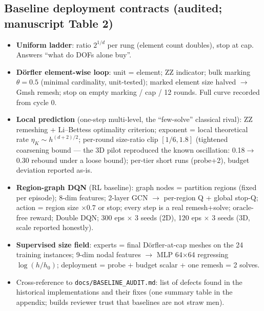 \documentclass[preprint,12pt]{elsarticle}
\newenvironment{plan}{\begin{itemize}\setlength\itemsep{0.15em}}{\end{itemize}}
\begin{document}
\subsection{Baseline deployment contracts (audited; manuscript Table 2)}
\begin{plan}
  \item \textbf{Uniform ladder}: ratio $2^{1/d}$ per rung (element count doubles), stop
        at cap. Answers ``what do DOFs alone buy''.
  \item \textbf{D\"orfler element-wise loop}: unit = element; ZZ indicator; bulk
        marking $\theta=0.5$ (minimal cardinality, unit-tested); marked element size
        halved $\to$ Gmsh remesh; stop on empty marking / cap / 12 rounds. Full curve
        recorded from cycle 0.
  \item \textbf{Local prediction} (one-step multi-level, the ``few-solve'' classical
        rival): ZZ remeshing + Li--Bettess optimality criterion; exponent = local
        theoretical rate $\eta_K\sim h^{(d+2)/2}$; per-round size-ratio clip
        $[1/6, 1.8]$ (tightened coarsening bound --- the 3D pilot reproduced the known
        oscillation: 0.18$\to$0.30 rebound under a loose bound); per-tier short runs
        (probe+2), budget deviation reported as-is.
  \item \textbf{Region-graph DQN} (RL baseline): graph nodes = partition regions
        (fixed per episode); 8-dim features; 2-layer GCN $\to$ per-region Q + global
        stop-Q; action = region size $\times 0.7$ or stop; every step is a real
        remesh+solve; oracle-free reward; Double DQN; 300 eps $\times$ 3 seeds (2D),
        120 eps $\times$ 3 seeds (3D, scale reported honestly).
  \item \textbf{Supervised size field}: experts = final D\"orfler-at-cap meshes on the
        24 training instances; 9-dim nodal features $\to$ MLP 64$\times$64 regressing
        $\log(h/h_0)$; deployment = probe + budget scalar + one remesh = 2 solves.
  \item Cross-reference to \texttt{docs/BASELINE\_AUDIT.md}: list of defects found in
        the historical implementations and their fixes (one summary table in the
        appendix; builds reviewer trust that baselines are not straw men).
\end{plan}
\end{document}
